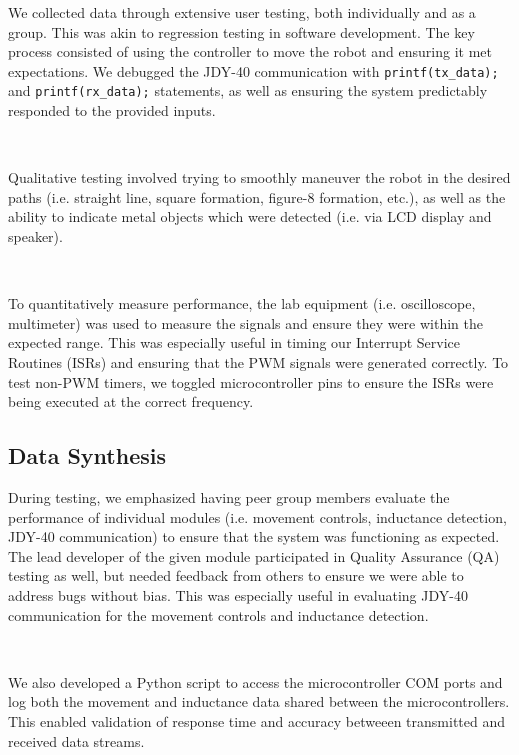 \documentclass{article}
\begin{document}
We collected data through extensive user testing, both individually and as a group. This was akin to regression testing in software development.
The key process consisted of using the controller to move the robot and ensuring it met expectations. We debugged the JDY-40 communication with
\texttt{printf(tx\_data);} and \texttt{printf(rx\_data);} statements, as well as ensuring the system predictably responded to the provided inputs.

\

Qualitative testing involved trying to smoothly maneuver the robot in the desired paths (i.e. straight line, square formation, figure-8 formation, etc.), as well as
the ability to indicate metal objects which were detected (i.e. via LCD display and speaker).

\

To quantitatively measure performance, the lab equipment (i.e. oscilloscope, multimeter) was used to measure the signals and ensure they were within
the expected range. This was especially useful in timing our Interrupt Service Routines (ISRs) and ensuring that the PWM signals were generated correctly.
To test non-PWM timers, we toggled microcontroller pins to ensure the ISRs were being executed at the correct frequency.

\subsection{Data Synthesis}

During testing, we emphasized having peer group members evaluate the performance of individual modules (i.e. movement controls, inductance detection, JDY-40 communication) to
ensure that the system was functioning as expected. The lead developer of the given module participated in Quality Assurance (QA) testing as well, but needed feedback from others to
ensure we were able to address bugs without bias. This was especially useful in evaluating JDY-40 communication for the movement controls and inductance detection.

\

We also developed a Python script to access the microcontroller COM ports and log both the movement and inductance data shared between the microcontrollers. This enabled validation of
response time and accuracy betweeen transmitted and received data streams.
\end{document}
